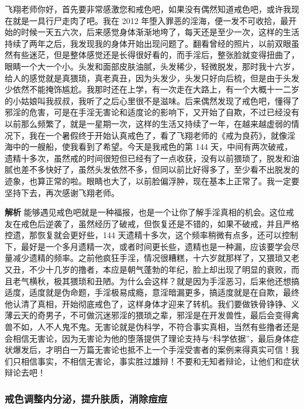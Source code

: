 \begin{case}
    飞翔老师你好，首先要非常感激您和戒色吧，如果没有偶然知道戒色吧，或许我现在就是一具行尸走肉了吧。我在 2012 年堕入罪恶的淫海，便一发不可收拾，最开始的时候一天五六次，后来感觉身体渐渐地垮了，每天还是至少一次，这样的生活持续了两年之后，我发现我的身体开始出现问题了。翻看曾经的照片，以前双眼虽然有些迷茫，但是整体感觉还是长得很好看的，而手淫后，整张脸就变得扭曲了，眼睛一个大一个小。头发和面部皮肤油腻，头发稀少，轻微脱发，那时我十六岁，给人的感觉就是真猥琐，真老真丑，因为头发少，头发只好向后梳，但是由于头发少依然不能掩饰尴尬。我那时还在上学，有一次走在大路上，有一个大概十一二岁的小姑娘叫我叔叔，我听了之后心里很不是滋味。后来偶然发现了戒色吧，懂得了邪淫的危害，可是在手淫无害论和适度论的影响下，又开始了自欺，不过已经没有以前那么频繁了，就是一星期一次，这样的生活又持续了一年，在越来越虚弱的情况下，我在一个暑假终于开始认真戒色了，看了飞翔老师的《戒为良药》，就像淫海中的一艘船，使我看到了希望。今天是我戒色的第 144 天，中间有两次破戒，遗精十多次，虽然戒的时间很短但已经有了一点收获，没有以前猥琐了，脱发和油腻也差不多快好了，虽然头发依然不多，但同以前比好得多了，至少看不出脱发的迹象，也算正常的啦。眼睛也大了，以前脸偏浮肿，现在基本上正常了。我一定要坚持下去，再次感谢飞翔老师。

    \textbf{解析} 能够遇见戒色吧就是一种福报，也是一个让你了解手淫真相的机会。这位戒友在戒色后逆袭了，虽然经历了破戒，但恢复还是不错的，如果不破戒，并且严格控遗，那恢复就会更好些，144 天遗精十多次，这个频率稍微有点多，还可以控制下，最好是一个多月遗精一次，或者时间更长些，遗精也是一种漏，应该要学会尽量减少遗精的频率。之前他疯狂手淫，情况很糟糕，十六岁就那样了，又猥琐又老又丑，不少十几岁的撸者，本应是朝气蓬勃的年纪，脸上却出现了明显的衰败，而且老气横秋，极其猥琐和丑陋。为什么会这样？就是因为手淫恶习，后来他还想搞适度，适度就是伪命题，手淫极易成瘾，意淫暗漏更多，搞适度就是在自欺，最终他认清了真相，开始彻底戒色了，这样身体才迎来了转机。我们要做铁骨铮铮、义薄云天的奇男子，不可做沉迷邪淫的猥琐之辈，邪淫是在开发兽性，最后会变得禽兽不如，人不人鬼不鬼。无害论就是伪科学，不符合事实真相，当然有些撸者还是会相信无害论，因为无害论为他的堕落提供了理论支持与“科学依据”，最后身体症状爆发后，才明白一万篇无害论也抵不上一个手淫受害者的案例来得真实可信！我们只相信事实，不相信无害论，事实胜过雄辩！不要和无知者辩论，让他们和症状辩论去吧！
\end{case}

\subsubsection{戒色调整内分泌，提升肤质，消除痘痘}

